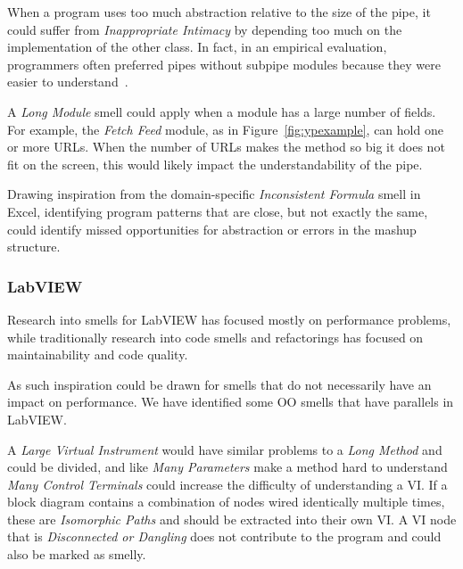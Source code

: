 \documentclass[10pt,conference,compsocconf]{IEEEtran}
\begin{document}
When a program uses too much abstraction relative to the size of the pipe, it could suffer from \emph{Inappropriate Intimacy} by depending too much on the implementation of the other class. In fact, in an empirical evaluation, programmers often preferred pipes without subpipe modules because they were easier to understand~\cite{StoleeTSE2013}. 

A \emph{Long Module} smell could apply when a module has a large number of fields. For example, the \emph{Fetch Feed} module, as in Figure~\ref{fig:ypexample}, can hold one or more URLs. When the number of URLs makes the method so big it does not fit on the screen, this would likely impact the understandability of the pipe. 

Drawing inspiration from the domain-specific \emph{Inconsistent Formula} smell in Excel, identifying program patterns that are close, but not exactly the same, could identify missed opportunities for abstraction or errors in the mashup structure. 

\subsubsection{LabVIEW}

Research into smells for LabVIEW has focused mostly on performance problems, while traditionally research into code smells and refactorings has focused on maintainability and code quality.

As such inspiration could be drawn for smells that do not necessarily have an impact on performance.
We have identified some OO smells that have parallels in LabVIEW.

A \emph{Large Virtual Instrument} would have similar problems to a \emph{Long Method} and could be divided, and like \emph{Many Parameters} make a method hard to understand \emph{Many Control Terminals} could increase the difficulty of understanding a VI.
If a block diagram contains a combination of nodes wired identically multiple times, these are \emph{Isomorphic Paths} and should be extracted into their own VI. 
A VI node that is \emph{Disconnected or Dangling} does not contribute to the program and could also be marked as smelly. 
\end{document}
